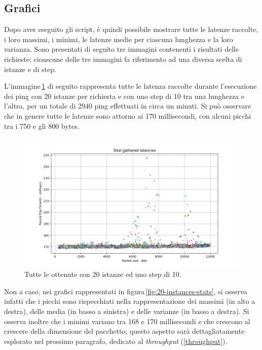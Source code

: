 \vspace{10px}\subsection*{Grafici}

\noindent Dopo aver eseguito gli script, è quindi possibile mostrare tutte le latenze raccolte, i loro massimi, i minimi, le latenze medie per ciascuna lunghezza e la loro varianza. Sono presentati di seguito tre immagini contenenti i risultati delle richieste; cioascune delle tre immagini fa riferimento ad una diversa scelta di istanze e di step.

L'immagine\,\ref{fig:20-instances-total} di seguito rappresenta tutte le latenza raccolte durante l'esecuzione dei ping con 20 istanze per richiesta e con uno step di 10 tra una lunghezza e l'altra, per un totale di 2940 ping effettuati in circa un minuti. Si può osservare che in genere tutte le latenze sono attorno ai 170 millisecondi, con alcuni picchi tra i 750 e gli 800 bytes.
\begin{figure}[h]
    \centering
    \includegraphics[width = .9\textwidth]{hw-2/report/imgs/20-instances/la-total-latencies.png}
    \caption{Tutte le ottenute con 20 istanze ed uno step di 10.}
    \label{fig:20-instances-total}
\end{figure}
Non a caso, nei grafici rappresentati in figura\,\ref{fig:20-instances-stats}, si osserva infatti che i picchi sono rispecchiati nella rappresentazione dei massimi (in alto a destra), delle media (in basso a sinistra) e delle varianze (in basso a destra). Si osserva inoltre che i minimi variano tra 168 e 170 millisecondi e che crescono al crescere della dimensione del pacchetto; questo aspetto sarà dettagliatamente esplorato nel prossimo paragrafo, dedicato al \textsl{throughput} (\ref{throughput}).
